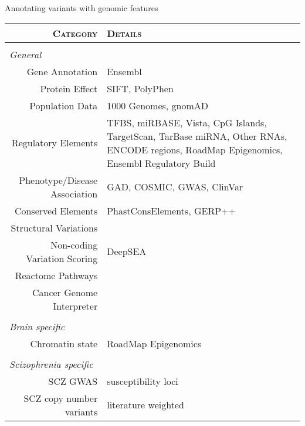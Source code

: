 \documentclass[usenames,dvipsnames]{beamer}
\begin{document}
\begin{frame}[label=annotations]{Annotating variants with genomic features}
\tiny

\begin{tabular}{rp{2in}}
\scshape{Category} & \scshape{Details}\\
\hline
&\\
\multicolumn{2}{l}{\textit{General}} \\
\hline
\rowcolor{Melon}
Gene Annotation & Ensembl\\
\rowcolor{GreenYellow}
Protein Effect & SIFT, PolyPhen\\
\rowcolor{Melon}
Population Data & 1000 Genomes, gnomAD\\
\rowcolor{GreenYellow}
Regulatory Elements & TFBS, miRBASE, Vista, CpG Islands, TargetScan, TarBase miRNA, Other RNAs, ENCODE regions, RoadMap Epigenomics, Ensembl Regulatory Build\\
\rowcolor{Melon}
Phenotype/Disease Association & GAD, COSMIC, GWAS, ClinVar\\
\rowcolor{GreenYellow}
Conserved Elements & PhastConsElements, GERP++\\
\rowcolor{Melon}
Structural Variations &\\
\rowcolor{GreenYellow}
Non-coding Variation Scoring & DeepSEA\\
\rowcolor{Melon}
Reactome Pathways &\\
\rowcolor{GreenYellow}
Cancer Genome Interpreter &\\
\hline
&\\
\multicolumn{2}{l}{\textit{Brain specific}} \\
\hline
\rowcolor{Melon}
Chromatin state & RoadMap Epigenomics \\
\hline
&\\
\multicolumn{2}{l}{\textit{Scizophrenia specific}} \\
\hline
\rowcolor{Melon}
SCZ GWAS & susceptibility loci \\
\rowcolor{GreenYellow}
SCZ copy number variants & literature weighted\\
\hline
\end{tabular}
\end{frame}

\end{document}
